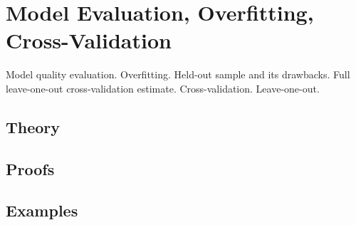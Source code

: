 
\section{Model Evaluation, Overfitting, Cross-Validation}
\label{sec:1.4.08-model-evaluation}

\begin{ticket}
Model quality evaluation. Overfitting. Held-out sample and its drawbacks. Full leave-one-out cross-validation estimate. Cross-validation. Leave-one-out.
\end{ticket}

\subsection*{Theory}

\subsection*{Proofs}

\subsection*{Examples}

